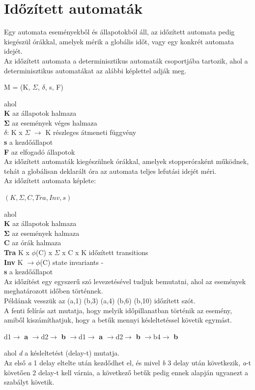\documentclass {report}
\begin{document}
\section{Időzített automaták}
 Egy automata eseményekből és állapotokból áll, az időzített automata pedig kiegészül órákkal, amelyek mérik a globális időt, vagy egy konkrét automata idejét. \\
 Az időzített automata a determinisztikus automaták csoportjába tartozik, ahol a determinisztikus automatákat az alábbi képlettel adják meg.\cite{Subbiah2009}
 \begin{center}
 M = (K, $\Sigma$, $\delta$, s, F)
 \end{center}
 ahol\\
 \indent \textbf{K} az állapotok halmaza\\
 \indent $\mathbf{\Sigma}$ az események véges halmaza\\
 \indent \textbf{$\delta$}: K x $\Sigma$ $\rightarrow$ K részleges átmeneti függvény\\
 \indent \textbf{s} a kezdőállapot\\
 \indent \textbf{F} az elfogadó állapotok \\
Az időzített automaták kiegészülnek órákkal, amelyek stopperóraként működnek, tehát a globálisan deklarált óra az automata teljes lefutási idejét méri.\\
Az időzített automata képlete:\\
\begin{center}
$(K, \Sigma, C, Tra, Inv, s)$\\
\end{center}
ahol\\
\indent \textbf{K} az állapotok halmaza\\
\indent $\mathbf{\Sigma}$ az események halmaza\\
\indent \textbf{C} az órák halmaza\\
\indent \textbf{Tra} K x $\phi$(C) x $ \Sigma $ x C x K időzített transitions\\
\indent \textbf{Inv} K $
\rightarrow  \phi$(C) state invariants -\\
\indent \textbf{s} a kezdőállapot \\
Az időzítést egy egyszerű szó levezetésével tudjuk bemutatni, ahol az események meghatározott időben történnek.\\
Példának vesszük az (a,1) (b,3) (a,4) (b,6) (b,10) időzített szót.\\
A fenti felírás azt mutatja, hogy melyik időpillanatban történik az esemény, amiből kiszámíthatjuk, hogy a betűk mennyi késleltetéssel követik egymást. 
\begin{center}
d1$\rightarrow$ \textbf{a} $\rightarrow$d2$\rightarrow$ \textbf{b} $\rightarrow$d1$\rightarrow$ \textbf{a} $\rightarrow$d2$\rightarrow$ \textbf{b} $\rightarrow$b4$\rightarrow$ \textbf{b}
\end{center}
ahol \emph{d} a késleltetést (delay-t) mutatja.\\
Az első \emph{a} 1 delay eltelte után kezdődhet el, és mivel \emph{b} 3 delay után következik, \emph{a}-t követően 2 delay-t kell várnia, a következő betűk pedig ennek alapján ugyanezt a szabályt követik. \cite{Behrmann2005} \cite{Panek2008}\\
\end{document}
